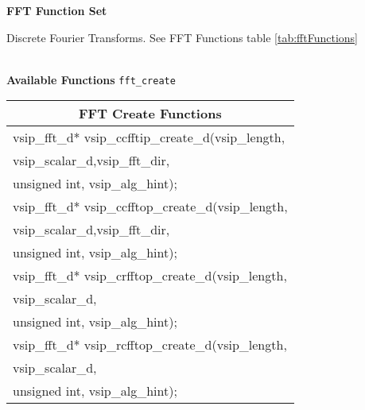 \clearpage
{\large \textbf{\hypertarget{fftFunc}{FFT Function Set}}}\vspace{.2cm}\\
\hspace*{.3cm}
\parbox{0.85\textwidth}{Discrete Fourier Transforms. See FFT Functions table \ref{tab:fftFunctions}}
\\\cvsiplh 
\newline \hspace*{.8cm} \vspace*{.1cm} \textbf{Available Functions }
\newline \hspace*{.8cm} \vspace*{.1cm} \texttt{fft\_create}
\newline \hspace*{1.1cm} {
\ttfamily
\begin{tabular}[H]{l}\hline
\hline \multicolumn{1}{c}{\rmfamily \bfseries FFT Create Functions\vspace{.1cm}}\\ \hline
vsip\_fft\_d* vsip\_ccfftip\_create\_d(vsip\_length, \\*\hspace{.7cm}vsip\_scalar\_d,vsip\_fft\_dir,\\*\hspace{.7cm} unsigned int, vsip\_alg\_hint);\vspace{.1cm}\\
vsip\_fft\_d* vsip\_ccfftop\_create\_d(vsip\_length, \\*\hspace{.7cm}vsip\_scalar\_d,vsip\_fft\_dir,\\*\hspace{.7cm} unsigned int, vsip\_alg\_hint);\vspace{.1cm}\\
vsip\_fft\_d* vsip\_crfftop\_create\_d(vsip\_length,\\*\hspace{.7cm}vsip\_scalar\_d,\\*\hspace{.7cm}unsigned int, vsip\_alg\_hint);\vspace{.1cm}\\
vsip\_fft\_d* vsip\_rcfftop\_create\_d(vsip\_length,\\*\hspace{.7cm}vsip\_scalar\_d,\\*\hspace{.7cm}unsigned int, vsip\_alg\_hint);\vspace{.1cm}\\

\end{tabular}}
